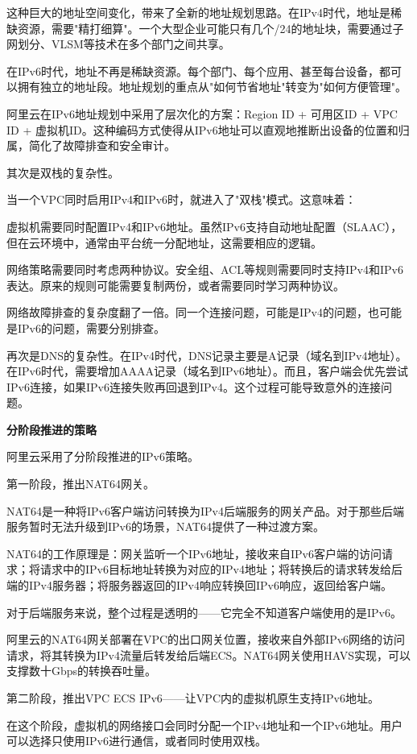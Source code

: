 这种巨大的地址空间变化，带来了全新的地址规划思路。在IPv4时代，地址是稀缺资源，需要"精打细算"。一个大型企业可能只有几个/24的地址块，需要通过子网划分、VLSM等技术在多个部门之间共享。

在IPv6时代，地址不再是稀缺资源。每个部门、每个应用、甚至每台设备，都可以拥有独立的地址段。地址规划的重点从"如何节省地址"转变为"如何方便管理"。

阿里云在IPv6地址规划中采用了层次化的方案：Region ID + 可用区ID + VPC ID + 虚拟机ID。这种编码方式使得从IPv6地址可以直观地推断出设备的位置和归属，简化了故障排查和安全审计。

其次是双栈的复杂性。

当一个VPC同时启用IPv4和IPv6时，就进入了"双栈"模式。这意味着：

虚拟机需要同时配置IPv4和IPv6地址。虽然IPv6支持自动地址配置（SLAAC），但在云环境中，通常由平台统一分配地址，这需要相应的逻辑。

网络策略需要同时考虑两种协议。安全组、ACL等规则需要同时支持IPv4和IPv6表达。原来的规则可能需要复制两份，或者需要同时学习两种协议。

网络故障排查的复杂度翻了一倍。同一个连接问题，可能是IPv4的问题，也可能是IPv6的问题，需要分别排查。

再次是DNS的复杂性。在IPv4时代，DNS记录主要是A记录（域名到IPv4地址）。在IPv6时代，需要增加AAAA记录（域名到IPv6地址）。而且，客户端会优先尝试IPv6连接，如果IPv6连接失败再回退到IPv4。这个过程可能导致意外的连接问题。

\textbf{分阶段推进的策略}

阿里云采用了分阶段推进的IPv6策略。

第一阶段，推出NAT64网关。

NAT64是一种将IPv6客户端访问转换为IPv4后端服务的网关产品。对于那些后端服务暂时无法升级到IPv6的场景，NAT64提供了一种过渡方案。

NAT64的工作原理是：网关监听一个IPv6地址，接收来自IPv6客户端的访问请求；将请求中的IPv6目标地址转换为对应的IPv4地址；将转换后的请求转发给后端的IPv4服务器；将服务器返回的IPv4响应转换回IPv6响应，返回给客户端。

对于后端服务来说，整个过程是透明的——它完全不知道客户端使用的是IPv6。

阿里云的NAT64网关部署在VPC的出口网关位置，接收来自外部IPv6网络的访问请求，将其转换为IPv4流量后转发给后端ECS。NAT64网关使用HAVS实现，可以支撑数十Gbps的转换吞吐量。

第二阶段，推出VPC ECS IPv6——让VPC内的虚拟机原生支持IPv6地址。

在这个阶段，虚拟机的网络接口会同时分配一个IPv4地址和一个IPv6地址。用户可以选择只使用IPv6进行通信，或者同时使用双栈。

